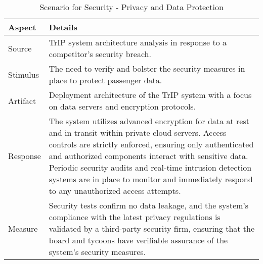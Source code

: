 \begin{table}[H]
    \centering
    \begin{tabularx}{\textwidth}{@{} lX @{}}
    \toprule
    \textbf{Aspect} & \textbf{Details} \\
    \midrule
    Source & TrIP system architecture analysis in response to a competitor's security breach. \\
    Stimulus & The need to verify and bolster the security measures in place to protect passenger data. \\
    Artifact & Deployment architecture of the TrIP system with a focus on data servers and encryption protocols. \\
    Response & The system utilizes advanced encryption for data at rest and in transit within private cloud servers. Access controls are strictly enforced, ensuring only authenticated and authorized components interact with sensitive data. Periodic security audits and real-time intrusion detection systems are in place to monitor and immediately respond to any unauthorized access attempts. \\
    Measure & Security tests confirm no data leakage, and the system's compliance with the latest privacy regulations is validated by a third-party security firm, ensuring that the board and tycoons have verifiable assurance of the system's security measures. \\
    \bottomrule
    \end{tabularx}
    \caption{Scenario for Security - Privacy and Data Protection}
    \label{table:security_privacy}
\end{table}
